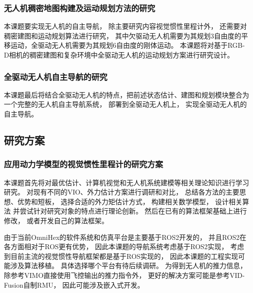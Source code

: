 
\subsubsection{无人机稠密地图构建及运动规划方法的研究}
本课题要实现无人机的自主导航，
除主要研究内容视觉惯性里程计外，
还需要对稠密建图和运动规划算法进行研究，
其中欠驱动无人机需要为其规划3自由度的平移运动，全驱动无人机需要为其规划6自由度的刚体运动。
本课题将对基于RGB-D相机的稠密建图和复杂环境中全驱动无人机的运动规划方案进行研究设计。

\subsubsection{全驱动无人机自主导航的研究}
本课题最后将结合全驱动无人机的特点，把前述状态估计、建图和规划模块整合为一个完整的无人机自主导航系统，
部署到全驱动无人机上，
实现全驱动无人机的自主导航。

\subsection{研究方案}
\subsubsection{应用动力学模型的视觉惯性里程计的研究方案}
本课题首先将对最优估计、计算机视觉和无人机系统建模等相关理论知识进行学习研究。
对现有不同的VIO、外力估计方案进行调研和对比，
总结各方法的主要思想、优势和短板，
选择合适的外力矩估计方式，
构建相关数学模型，
设计相关算法
并尝试针对研究对象的特点进行理论创新。
然后在已有的算法框架基础上进行修改，
或者开发自己的算法框架。

由于当前OmniHex的软件系统和仿真平台是主要基于ROS2开发的，
并且ROS2在各方面相对于ROS更有优势，
因此本课题的导航系统考虑基于ROS2实现，
考虑到目前主流的视觉惯性导航框架都是基于ROS实现的，
因此本课题的工程实现可能涉及算法移植。
具体选择哪个平台有待后续调研。
为得到无人机的推力信息，
除参考VIMO直接使用飞控输出的推力指令外，
更好的解决方案可能是参考VID-Fusion自制RMU，
因此可能涉及嵌入式开发。

